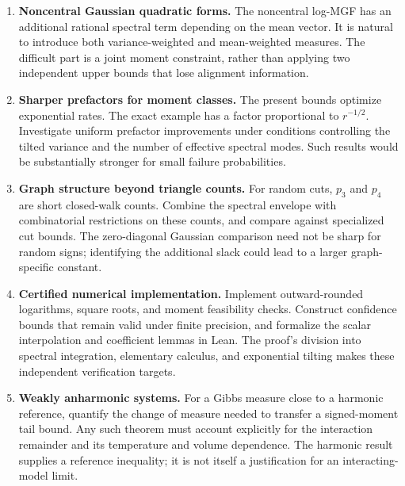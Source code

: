 \documentclass[11pt,letterpaper]{article}
\numberwithin{equation}{section}
\theoremstyle{definition}\newtheorem{definition}[theorem]{Definition}
\theoremstyle{remark}\newtheorem{remark}[theorem]{Remark}
\begin{document}
\begin{enumerate}[leftmargin=*]
\item \textbf{Noncentral Gaussian quadratic forms.}
The noncentral log-MGF has an additional rational spectral term
depending on the mean vector. It is natural to introduce both
variance-weighted and mean-weighted measures. The difficult part
is a joint moment constraint, rather than applying two independent
upper bounds that lose alignment information.

\item \textbf{Sharper prefactors for moment classes.}
The present bounds optimize exponential rates. The exact example
has a factor proportional to $r^{-1/2}$. Investigate uniform
prefactor improvements under conditions controlling the tilted
variance and the number of effective spectral modes. Such results
would be substantially stronger for small failure probabilities.

\item \textbf{Graph structure beyond triangle counts.}
For random cuts, $p_3$ and $p_4$ are short closed-walk counts.
Combine the spectral envelope with combinatorial restrictions on
these counts, and compare against specialized cut bounds. The
zero-diagonal Gaussian comparison need not be sharp for random
signs; identifying the additional slack could lead to a larger
graph-specific constant.

\item \textbf{Certified numerical implementation.}
Implement outward-rounded logarithms, square roots, and moment
feasibility checks. Construct confidence bounds that remain valid
under finite precision, and formalize the scalar interpolation and
coefficient lemmas in Lean. The proof's division into spectral
integration, elementary calculus, and exponential tilting makes
these independent verification targets.

\item \textbf{Weakly anharmonic systems.}
For a Gibbs measure close to a harmonic reference, quantify the
change of measure needed to transfer a signed-moment tail bound.
Any such theorem must account explicitly for the interaction
remainder and its temperature and volume dependence. The harmonic
result supplies a reference inequality; it is not itself a
justification for an interacting-model limit.
\end{enumerate}

\appendix
\end{document}
